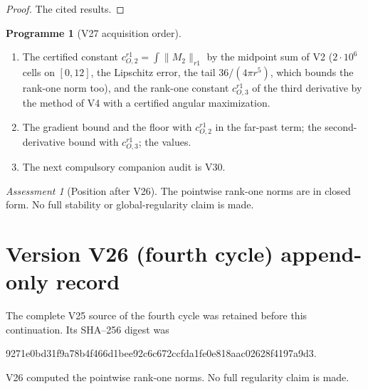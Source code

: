\documentclass[11pt]{article}
\theoremstyle{plain}
\theoremstyle{definition}
\newtheorem{programme}[theorem]{Programme}
\theoremstyle{remark}
\newtheorem{assessment}[theorem]{Assessment}
\begin{document}
\begin{proof}
The cited results.
\end{proof}

\begin{programme}[V27 acquisition order]
\label{prog:c4v27}
\begin{enumerate}[label=\textup{(AC\arabic*)},leftmargin=4.8em]
\item The certified constant \(c_{O,2}^{r1}=\int\|M_2\|_{r1}\) by the midpoint sum of V2
      (\(2\cdot10^6\) cells on \([0,12]\), the Lipschitz error, the tail \(36/(4\pi r^5)\), which
      bounds the rank-one norm too), and the rank-one constant
      \(c_{O,3}^{r1}\) of the third derivative by the method of V4 with a
      certified angular maximization.
\item The gradient bound and the floor with \(c_{O,2}^{r1}\) in the far-past
      term; the second-derivative bound with \(c_{O,3}^{r1}\); the values.
\item The next compulsory companion audit is V30.
\end{enumerate}
\end{programme}

\begin{assessment}[Position after V26]
\label{ass:c4v26-position}
The pointwise rank-one norms are in closed form.  No full stability
or global-regularity claim is made.
\end{assessment}

\section*{Version V26 (fourth cycle) append-only record}

The complete V25 source of the fourth cycle was retained before this
continuation.  Its SHA--256 digest was
\begin{center}\scriptsize\ttfamily
9271e0bd31f9a78b4f466d1bee92c6c672ccfda1fe0e818aac02628f4197a9d3.
\end{center}
V26 computed the pointwise rank-one norms.  No full regularity claim
is made.
\end{document}
